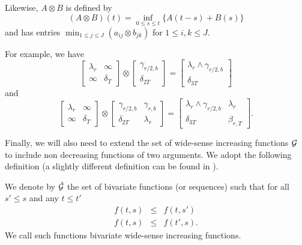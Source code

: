Likewise, $A \otimes B$ is defined by
$$ (A \otimes B)(t) = \inf_{0 \leq s \leq t} \{ A(t-s) + B(s) \} $$
and has entries
$\min_{1 \leq j \leq J} (a_{ij} \otimes b_{jk}) $ for $1 \leq i,k \leq J$.

For example, we have
$$ \left[ \begin{array}{cc} \lambda_r & \infty \\ \infty & \delta_T \end{array} \right] \otimes \left[ \begin{array}{c} \gamma_{r/2,b} \\ \delta_{2T} \end{array} \right]
= \left[ \begin{array}{c} \lambda_r \wedge \gamma_{r/2,b} \\ \delta_{3T} \end{array} \right]  $$
and
$$ \left[ \begin{array}{cc} \lambda_r & \infty \\ \infty & \delta_T \end{array} \right] \otimes \left[ \begin{array}{cc} \gamma_{r/2,b} & \gamma_{r,b} \\ \delta_{2T} & \lambda_r \end{array} \right] =
\left[ \begin{array}{cc} \lambda_r \wedge \gamma_{r/2,b} & \lambda_r\\ \delta_{3T} & \beta_{r,T} \end{array} \right].  $$


Finally, we will also need to extend the set of wide-sense increasing functions $\mathcal G$ to include non decreasing functions of two arguments. We adopt the following definition (a slightly different definition can be found in \cite{Changbook}).

\begin{definition}
We denote by  $\tilde{\mathcal G}$ the set of bivariate functions (or sequences) such that for all $s' \leq s$ and any $t \leq t'$
\begin{eqnarray*}
f(t,s) & \leq & f(t,s') \\
f(t,s) & \leq & f(t',s).
\end{eqnarray*}
We call such functions bivariate wide-sense increasing functions.
\end{definition}

